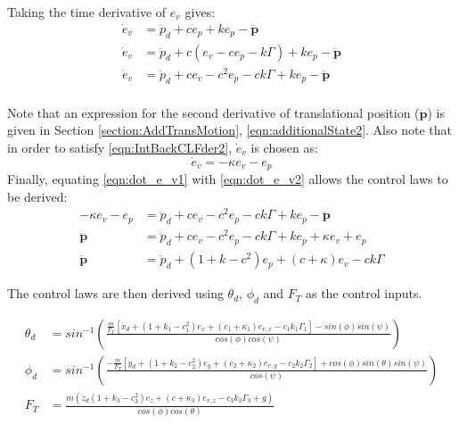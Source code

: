 Taking the time derivative of $e_{v}$ gives:
\begin{equation}\label{eqn:dot_e_v1}
\begin{split}
\dot{e}_{v}&=\ddot{p}_{d}+c\dot{e}_{p}+k e_{p} - \mathbf{\ddot{p}}\\
\dot{e}_{v}&=\ddot{p}_{d}+c(e_{v}-ce_{p}-k\Gamma)+k e_{p} - \mathbf{\ddot{p}}\\
\dot{e}_{v}&=\ddot{p}_{d}+ce_{v}-c^{2}e_{p}-ck\Gamma+k e_{p} - \mathbf{\ddot{p}}\\
\end{split}
\end{equation} 

Note that an expression for the second derivative of translational position ($\mathbf{\ddot{p}}$) is given in Section \ref{section:AddTransMotion}, \eqref{eqn:additionalState2}. Also note that in order to satisfy \eqref{eqn:IntBackCLFder2}, $\dot{e}_{v}$ is chosen as:
\begin{equation}\label{eqn:dot_e_v2}
\dot{e}_{v}=-\kappa e_{v} - e_{p}
\end{equation}
Finally, equating \eqref{eqn:dot_e_v1} with \eqref{eqn:dot_e_v2} allows the control laws to be derived:
\begin{equation}\label{eqn:dot_e_v3}
\begin{split}
-\kappa e_{v} - e_{p}&=\ddot{p}_{d}+ce_{v}-c^{2}e_{p}-ck\Gamma+k e_{p} - \mathbf{\ddot{p}}\\
\mathbf{\ddot{p}}&=\ddot{p}_{d}+ce_{v}-c^{2}e_{p}-ck\Gamma+k e_{p} +\kappa e_{v} + e_{p}\\
\mathbf{\ddot{p}}&=\ddot{p}_{d}+(1+k-c^{2})e_{p}+(c+\kappa)e_{v}-ck\Gamma
\end{split}
\end{equation}

The control laws are then derived using $\theta_{d}$, $\phi_{d}$ and $F_{T}$ as the control inputs.

 \begin{equation}\label{eqn:IntBackContLaws}
\begin{split}
\theta_{d}&=sin^{-1}\left(\frac{\frac{m}{F_{T}}[\ddot{x}_{d}+(1+k_{1}-c_{1}^{2})e_{x}+(c_{1}+\kappa_{1})e_{v,x}-c_{1}k_{1}\Gamma_{1}]-sin(\phi)sin(\psi)}{cos(\phi)cos(\psi)}\right)\\
\phi_{d}&=sin^{-1}\left(\frac{-\frac{m}{F_{T}}[\ddot{y}_{d}+(1+k_{2}-c_{2}^{2})e_{y}+(c_{2}+\kappa_{2})e_{v,y}-c_{2}k_{2}\Gamma_{2}]+cos(\phi)sin(\theta)sin(\psi)}{cos(\psi)}\right)\\
F_{T}&=\frac{m(\ddot{z}_{d}(1+k_{3}-c_{3}^{2})e_{z}+(c+\kappa_{3})e_{v,z}-c_{3}k_{3}\Gamma_{3}+g)}{cos(\phi)cos(\theta)}
\end{split}
\end{equation}




